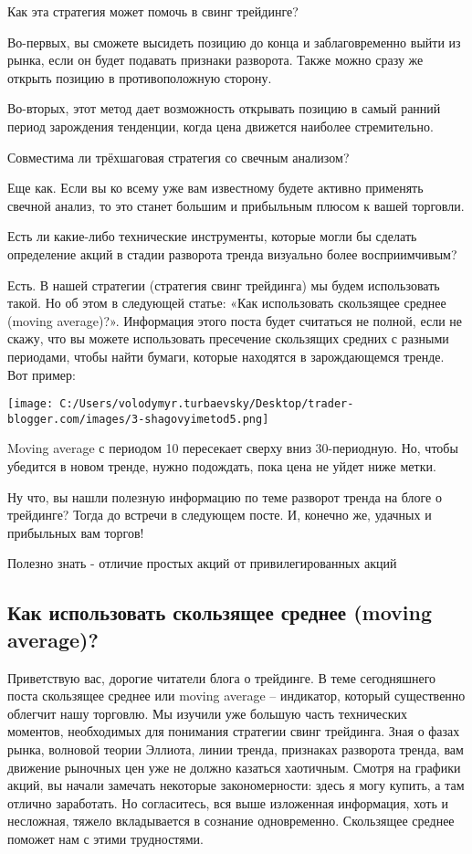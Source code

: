 \documentclass[a5paper]{article}
\begin{document}
Как эта стратегия может помочь в свинг трейдинге?

Во-первых, вы сможете высидеть позицию до конца и заблаговременно выйти из рынка, если он будет подавать признаки разворота. Также можно сразу же открыть позицию в противоположную сторону.

Во-вторых, этот метод дает возможность открывать позицию в самый ранний период зарождения тенденции, когда цена движется наиболее стремительно.

Совместима ли трёхшаговая стратегия со свечным анализом?

Еще как. Если вы ко всему уже вам известному будете активно применять свечной анализ, то это станет большим и прибыльным плюсом к вашей торговли.

Есть ли какие-либо технические инструменты, которые могли бы сделать определение акций в стадии разворота тренда визуально более восприимчивым?

Есть. В нашей стратегии (стратегия свинг трейдинга) мы будем
использовать такой. Но об этом в следующей статье: «Как использовать
скользящее среднее (moving average)?». Информация этого поста будет
считаться не полной, если не скажу, что вы можете использовать
пресечение скользящих средних с разными периодами, чтобы найти бумаги,
которые находятся в зарождающемся тренде. Вот пример:

\texttt{[image: C:/Users/volodymyr.turbaevsky/Desktop/trader-blogger.com/images/3-shagovyimetod5.png]}

Moving average с периодом 10 пересекает сверху вниз 30-периодную. Но, чтобы убедится в новом тренде, нужно подождать, пока цена не уйдет ниже метки.

Ну что, вы нашли полезную информацию по теме разворот тренда на блоге о трейдинге? Тогда до встречи в следующем посте. И, конечно же, удачных и прибыльных вам торгов!

Полезно знать - отличие простых акций от привилегированных акций

\subsection{Как использовать скользящее среднее (moving average)?}

Приветствую вас, дорогие читатели блога о трейдинге. В теме
сегодняшнего поста скользящее среднее или moving average – индикатор,
который существенно облегчит нашу торговлю. Мы изучили уже большую
часть технических моментов, необходимых для понимания стратегии свинг
трейдинга. Зная о фазах рынка, волновой теории Эллиота, линии тренда,
признаках разворота тренда, вам движение рыночных цен уже не должно
казаться хаотичным. Смотря на графики акций, вы начали замечать
некоторые закономерности: здесь я могу купить, а там отлично
заработать. Но согласитесь, вся выше изложенная информация, хоть и
несложная, тяжело вкладывается в сознание одновременно. Скользящее
среднее поможет нам с этими трудностями.
\end{document}
